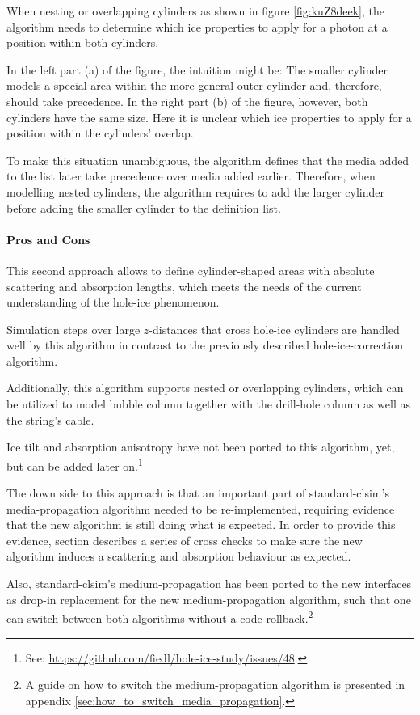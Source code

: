 When nesting or overlapping cylinders as shown in figure \ref{fig:kuZ8deek}, the algorithm needs to determine which ice properties to apply for a photon at a position within both cylinders.

In the left part (a) of the figure, the intuition might be: The smaller cylinder models a special area within the more general outer cylinder and, therefore, should take precedence. In the right part (b) of the figure, however, both cylinders have the same size. Here it is unclear which ice properties to apply for a position within the cylinders' overlap.

To make this situation unambiguous, the algorithm defines that the media added to the list later take precedence over media added earlier. Therefore, when modelling nested cylinders, the algorithm requires to add the larger cylinder before adding the smaller cylinder to the definition list.

\paragraph{Pros and Cons}
This second approach allows to define cylinder-shaped areas with absolute scattering and absorption lengths, which meets the needs of the current understanding of the hole-ice phenomenon.

Simulation steps over large $z$-distances that cross hole-ice cylinders are handled well by this algorithm in contrast to the previously described hole-ice-correction algorithm.

Additionally, this algorithm supports nested or overlapping cylinders, which can be utilized to model bubble column together with the drill-hole column as well as the string's cable.

Ice tilt and absorption anisotropy have not been ported to this algorithm, yet, but can be added later on.\footnote{See: \url{https://github.com/fiedl/hole-ice-study/issues/48}.}

The down side to this approach is that an important part of standard-clsim's media-propagation algorithm needed to be re-implemented, requiring evidence that the new algorithm is still doing what is expected. In order to provide this evidence, section  describes a series of cross checks to make sure the new algorithm induces a scattering and absorption behaviour as expected.

Also, standard-clsim's medium-propagation has been ported to the new interfaces as drop-in replacement for the new medium-propagation algorithm, such that one can switch between both algorithms without a code rollback.\footnote{A guide on how to switch the medium-propagation algorithm is presented in appendix \ref{sec:how_to_switch_media_propagation}.}

